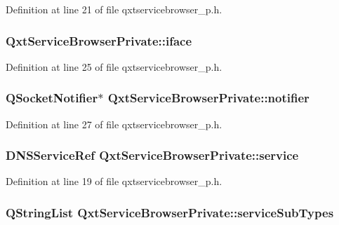 Definition at line 21 of file qxtservicebrowser\-\_\-p.\-h.

\hypertarget{class_qxt_service_browser_private_a134886c8e04b918ff8b0cba73a5aa503}{
\subsubsection[{iface}]{ Qxt\-Service\-Browser\-Private\-::iface}}\label{class_qxt_service_browser_private_a134886c8e04b918ff8b0cba73a5aa503}


Definition at line 25 of file qxtservicebrowser\-\_\-p.\-h.

\hypertarget{class_qxt_service_browser_private_a2e77003ebf8a8722e0c0d8cb3793dfc4}{
\subsubsection[{notifier}]{\setlength{\rightskip}{0pt plus 5cm}Q\-Socket\-Notifier$\ast$ Qxt\-Service\-Browser\-Private\-::notifier}}\label{class_qxt_service_browser_private_a2e77003ebf8a8722e0c0d8cb3793dfc4}


Definition at line 27 of file qxtservicebrowser\-\_\-p.\-h.

\hypertarget{class_qxt_service_browser_private_a63f1b88da5fbdd8de21d6698711b6c64}{
\subsubsection[{service}]{\setlength{\rightskip}{0pt plus 5cm}D\-N\-S\-Service\-Ref Qxt\-Service\-Browser\-Private\-::service}}\label{class_qxt_service_browser_private_a63f1b88da5fbdd8de21d6698711b6c64}


Definition at line 19 of file qxtservicebrowser\-\_\-p.\-h.

\hypertarget{class_qxt_service_browser_private_ab21ba745c800294e8385135c14a78000}{
\subsubsection[{service\-Sub\-Types}]{\setlength{\rightskip}{0pt plus 5cm}Q\-String\-List Qxt\-Service\-Browser\-Private\-::service\-Sub\-Types}}\label{class_qxt_service_browser_private_ab21ba745c800294e8385135c14a78000}


